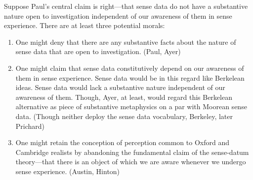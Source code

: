\documentclass[11pt]{article}
\begin{document}
Suppose Paul's central claim is right---that sense data do not have a substantive nature open to investigation independent of our awareness of them in sense experience. There are at least three potential morals:
\begin{enumerate}
    \item One might deny that there are any substantive facts about the nature of sense data that are open to investigation. (Paul, Ayer)
    \item One might claim that sense data constitutively depend on our awareness of them in sense experience. Sense data would be in this regard like Berkelean ideas. Sense data would lack a substantive nature independent of our awareness of them. Though, Ayer, at least, would regard this Berkelean alternative as piece of substantive metaphysics on a par with Moorean sense data. (Though neither deploy the sense data vocabulary, Berkeley, later Prichard)
    \item One might retain the conception of perception common to Oxford and Cambridge realists by abandoning the fundamental claim of the sense-datum theory---that there is an object of which we are aware whenever we undergo sense experience. (Austin, Hinton)
\end{enumerate}

\end{document}
